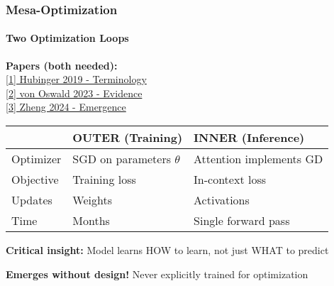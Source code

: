 \documentclass[10pt,aspectratio=169]{beamer}
\begin{document}
\begin{frame}
\frametitle{Mesa-Optimization}
\framesubtitle{Two Optimization Loops}

\begin{center}
\Large
\textbf{Papers (both needed):}\\\href{papers/1906.01820_risks_learned_optimization.pdf}{\color{blue}[1] Hubinger 2019 - Terminology}\\\href{papers/2309.05858_mesa_optimization.pdf}{\color{blue}[2] von Oswald 2023 - Evidence}\\\href{papers/2405.16845_mesa_optimization_emergence.pdf}{\color{blue}[3] Zheng 2024 - Emergence}
\end{center}

\vspace{0.5cm}

\begin{center}
\begin{tabular}{|l|l|l|}
\hline
& \textbf{OUTER (Training)} & \textbf{INNER (Inference)} \\
\hline
Optimizer & SGD on parameters $\theta$ & Attention implements GD \\
\hline
Objective & Training loss & In-context loss \\
\hline
Updates & Weights & Activations \\
\hline
Time & Months & Single forward pass \\
\hline
\end{tabular}
\end{center}

\vspace{0.5cm}
\textbf{Critical insight:} Model learns HOW to learn, not just WHAT to predict

\vspace{0.3cm}
\textbf{Emerges without design!} Never explicitly trained for optimization
\end{frame}
\end{document}
